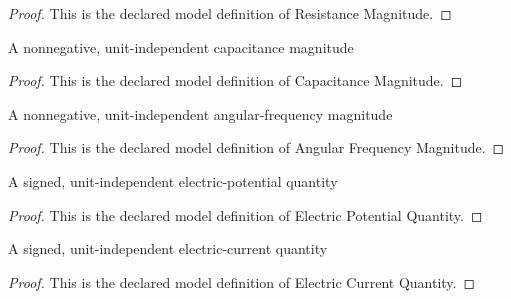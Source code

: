 \begin{proof}
  This is the declared model definition of Resistance Magnitude.
\end{proof}
\begin{definition}
  \label{def:physics:phyx-mini-0942:phyxminiproblems-problemphyxmini0942-capacitancemagnitude}
  A nonnegative, unit-independent capacitance magnitude
\end{definition}
\begin{proof}
  This is the declared model definition of Capacitance Magnitude.
\end{proof}
\begin{definition}
  \label{def:physics:phyx-mini-0942:phyxminiproblems-problemphyxmini0942-angularfrequencymagnitude}
  A nonnegative, unit-independent angular-frequency magnitude
\end{definition}
\begin{proof}
  This is the declared model definition of Angular Frequency Magnitude.
\end{proof}
\begin{definition}
  \label{def:physics:phyx-mini-0942:phyxminiproblems-problemphyxmini0942-electricpotentialquantity}
  A signed, unit-independent electric-potential quantity
\end{definition}
\begin{proof}
  This is the declared model definition of Electric Potential Quantity.
\end{proof}
\begin{definition}
  \label{def:physics:phyx-mini-0942:phyxminiproblems-problemphyxmini0942-electriccurrentquantity}
  A signed, unit-independent electric-current quantity
\end{definition}
\begin{proof}
  This is the declared model definition of Electric Current Quantity.
\end{proof}
